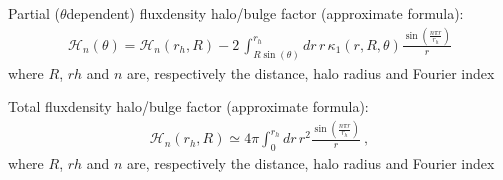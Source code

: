 \documentclass[letterpaper,10pt,english]{sphinxmanual}
\begin{document}
\begin{fulllineitems}
\label{\detokenize{diffsph.utils:diffsph.utils.tools.approxhalo_fd}}
\sphinxAtStartPar
Partial (\(\theta\)\sphinxhyphen{}dependent) flux\sphinxhyphen{}density halo/bulge factor (approximate formula):
\begin{equation*}
\begin{split}\mathcal H_n(\theta) = \mathcal H_n(r_h,R) - 2\,\int_{R\sin(\theta)}^{r_h}dr\, r\, \kappa_1(r,R,\theta) \frac{\sin\left(\frac{n\pi r}{r_h}\right)}r\end{split}
\end{equation*}
\sphinxAtStartPar
where \(R\), \(rh\) and \(n\) are, respectively the distance, halo radius and Fourier index

\end{fulllineitems}


\begin{fulllineitems}
\label{\detokenize{diffsph.utils:diffsph.utils.tools.approxhalo_fd_tot}}
\sphinxAtStartPar
Total flux\sphinxhyphen{}density halo/bulge factor (approximate formula):
\begin{equation*}
\begin{split}\mathcal H_n(r_h,R) \simeq 4\pi\int_0^{r_h}dr\, r^2 \frac{\sin\left(\frac{n\pi r}{r_h}\right)}r \ ,\end{split}
\end{equation*}
\sphinxAtStartPar
where \(R\), \(rh\) and \(n\) are, respectively the distance, halo radius and Fourier index

\end{fulllineitems}

\end{document}
